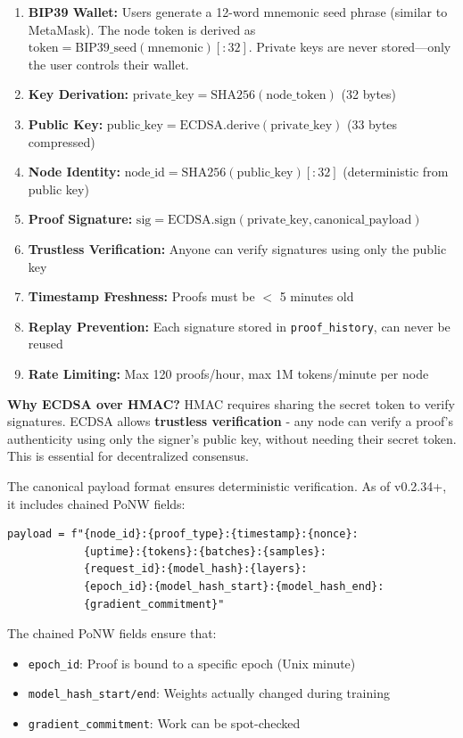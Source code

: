 \documentclass[11pt,a4paper]{article}
\begin{document}
\begin{enumerate}
    \item \textbf{BIP39 Wallet:} Users generate a 12-word mnemonic seed phrase (similar to MetaMask). The node token is derived as $\text{token} = \text{BIP39\_seed}(\text{mnemonic})[:32]$. Private keys are never stored---only the user controls their wallet.
    \item \textbf{Key Derivation:} $\text{private\_key} = \text{SHA256}(\text{node\_token})$ (32 bytes)
    \item \textbf{Public Key:} $\text{public\_key} = \text{ECDSA.derive}(\text{private\_key})$ (33 bytes compressed)
    \item \textbf{Node Identity:} $\text{node\_id} = \text{SHA256}(\text{public\_key})[:32]$ (deterministic from public key)
    \item \textbf{Proof Signature:} $\text{sig} = \text{ECDSA.sign}(\text{private\_key}, \text{canonical\_payload})$
    \item \textbf{Trustless Verification:} Anyone can verify signatures using only the public key
    \item \textbf{Timestamp Freshness:} Proofs must be $<$ 5 minutes old
    \item \textbf{Replay Prevention:} Each signature stored in \texttt{proof\_history}, can never be reused
    \item \textbf{Rate Limiting:} Max 120 proofs/hour, max 1M tokens/minute per node
\end{enumerate}

\textbf{Why ECDSA over HMAC?} HMAC requires sharing the secret token to verify signatures. ECDSA allows \textbf{trustless verification} - any node can verify a proof's authenticity using only the signer's public key, without needing their secret token. This is essential for decentralized consensus.

The canonical payload format ensures deterministic verification. As of v0.2.34+, it includes chained PoNW fields:
\begin{verbatim}
payload = f"{node_id}:{proof_type}:{timestamp}:{nonce}:
            {uptime}:{tokens}:{batches}:{samples}:
            {request_id}:{model_hash}:{layers}:
            {epoch_id}:{model_hash_start}:{model_hash_end}:
            {gradient_commitment}"
\end{verbatim}

The chained PoNW fields ensure that:
\begin{itemize}
    \item \texttt{epoch\_id}: Proof is bound to a specific epoch (Unix minute)
    \item \texttt{model\_hash\_start/end}: Weights actually changed during training
    \item \texttt{gradient\_commitment}: Work can be spot-checked
\end{itemize}
\end{document}
